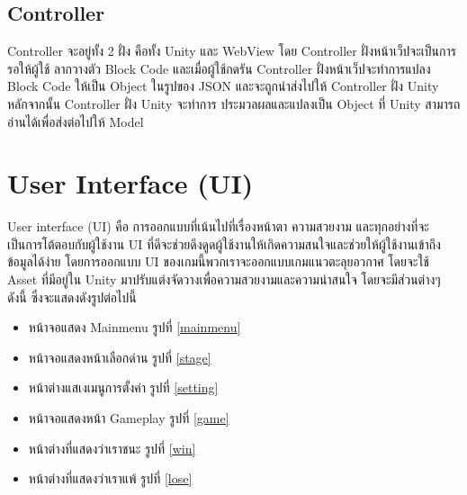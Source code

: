 \subsection{Controller}
Controller จะอยู่ทั้ง 2 ฝั่ง คือทั้ง Unity และ WebView โดย Controller ฝั่งหน้าเว็ปจะเป็นการรอให้ผู้ใช้
ลากวางตัว Block Code และเมื่อผู้ใช้กดรัน Controller ฝั่งหน้าเว็ปจะทำการแปลง Block Code ให้เป็น Object 
ในรูปของ JSON และจะถูกนำส่งไปให้ Controller ฝั่ง Unity หลักจากนั้น Controller ฝั่ง Unity จะทำการ
ประมวลผลและแปลงเป็น Object ที่ Unity สามารถอ่านได้เพื่อส่งต่อไปให้ Model

\section{User Interface (UI)}
User interface (UI) คือ การออกแบบที่เน้นไปที่เรื่องหน้าตา ความสวยงาม และทุกอย่างที่จะเป็นการโต้ตอบกับผู้ใช้งาน UI ที่ดีจะช่วยดึงดูดผู้ใช้งานให้เกิดความสนใจและช่วยให้ผู้ใช้งานเข้าถึงข้อมูลได้ง่าย
โดยการออกแบบ UI ของเกมนี้พวกเราจะออกแบบเกมแนวตะลุยอวกาศ โดยจะใช้ Asset ที่มีอยู่ใน Unity มาปรับแต่งจัดวางเพื่อความสวยงามและความน่าสนใจ โดยจะมีส่วนต่างๆ ดังนี้ ซึ่งจะแสดงดังรูปต่อไปนี้
\begin{itemize}
\item หน้าจอแสดง Mainmenu รูปที่ \ref{mainmenu}
\item หน้าจอแสดงหน้าเลือกด่าน รูปที่ \ref{stage}
\item หน้าต่างแสเงเมนูการตั้งค่า รูปที่ \ref{setting}
\item หน้าจอแสดงหน้า Gameplay รูปที่ \ref{game}
\item หน้าต่างที่แสดงว่าเราชนะ รูปที่ \ref{win}
\item หน้าต่างที่แสดงว่าเราแพ้ รูปที่ \ref{lose}
\end{itemize}


